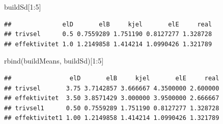 \documentclass[
]{article}
\newenvironment{Shaded}{\begin{snugshade}}{\end{snugshade}}
\newcommand{\DecValTok}[1]{\textcolor[rgb]{0.00,0.00,0.81}{#1}}
\newcommand{\FunctionTok}[1]{\textcolor[rgb]{0.00,0.00,0.00}{#1}}
\newcommand{\NormalTok}[1]{#1}
\newcommand{\SpecialCharTok}[1]{\textcolor[rgb]{0.00,0.00,0.00}{#1}}
\begin{document}
\begin{Shaded}
\begin{Highlighting}[]
\NormalTok{buildSd[}\DecValTok{1}\SpecialCharTok{:}\DecValTok{5}\NormalTok{]}
\end{Highlighting}
\end{Shaded}

\begin{verbatim}
##              elD       elB     kjel       elE     real
## trivsel      0.5 0.7559289 1.751190 0.8127277 1.328728
## effektivitet 1.0 1.2149858 1.414214 1.0990426 1.321789
\end{verbatim}

\begin{Shaded}
\begin{Highlighting}[]
\FunctionTok{rbind}\NormalTok{(buildMeans, buildSd)[}\DecValTok{1}\SpecialCharTok{:}\DecValTok{5}\NormalTok{]}
\end{Highlighting}
\end{Shaded}

\begin{verbatim}
##                elD       elB     kjel       elE     real
## trivsel       3.75 3.7142857 3.666667 4.3500000 2.600000
## effektivitet  3.50 3.8571429 3.000000 3.9500000 2.666667
## trivsel1      0.50 0.7559289 1.751190 0.8127277 1.328728
## effektivitet1 1.00 1.2149858 1.414214 1.0990426 1.321789
\end{verbatim}
\end{document}
